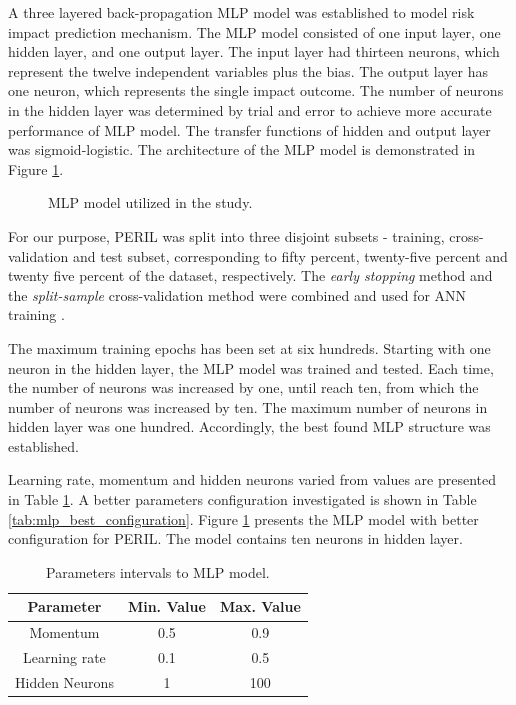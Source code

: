 \documentclass[a4paper,twoside]{article}
\begin{document}
A three layered back-propagation MLP model was established to model risk impact prediction mechanism. The MLP model consisted of one input layer, one hidden layer, and one output layer. The input layer had thirteen neurons, which represent the twelve independent variables plus the bias. The output layer has one neuron, which represents the single impact outcome. The number of neurons in the hidden layer was determined by trial and error to achieve more accurate performance of MLP model. The transfer functions of hidden and output layer was sigmoid-logistic. The architecture of the MLP model is demonstrated in Figure \ref{fig:mlpmodelstudy}.

\begin{figure}[!h]
  \vspace{-0.2cm}
  \centering
  \def \svgwidth{\columnwidth}
  
  \caption{MLP model utilized in the study.}
  \label{fig:mlpmodelstudy}
\end{figure}

For our purpose, PERIL was split into three disjoint subsets - training, cross-validation and test subset, corresponding to fifty percent, twenty-five percent and twenty five percent of the dataset, respectively. The \textit{early stopping} method and the \textit{split-sample} cross-validation method were combined and used for ANN training \cite{priddy2005artificial}.

The maximum training epochs has been set at six hundreds. Starting with one neuron in the hidden layer, the MLP model was trained and tested. Each time, the number of neurons was increased by one, until reach ten, from which the number of neurons was increased by ten. The maximum number of neurons in hidden layer was one hundred. Accordingly, the best found MLP structure was established. 

Learning rate, momentum and hidden neurons varied from values are presented in Table \ref{tab:mlp_configuration_investigation}. A better parameters configuration investigated is shown in Table \ref{tab:mlp_best_configuration}. Figure \ref{fig:mlpmodelstudy} presents the MLP model with better configuration for PERIL. The model contains ten neurons in hidden layer.

\begin{table}[h]
\caption{Parameters intervals to MLP model.}\label{tab:mlp_configuration_investigation} \centering
\begin{tabular}{|c|c|c|}
  \hline
  Parameter & Min. Value & Max. Value \\
  \hline
  Momentum & 0.5 & 0.9 \\
  \hline
  Learning rate & 0.1 & 0.5 \\
  \hline
  Hidden Neurons & 1 & 100 \\
  \hline
\end{tabular}
\end{table}
\end{document}
